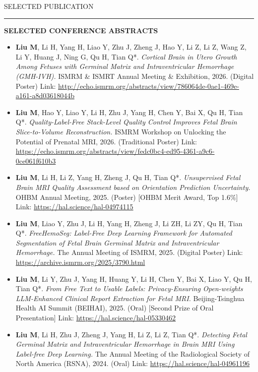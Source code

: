 \documentclass{resume} %
\renewenvironment{rSection}[1]{
\sectionskip
\textcolor{TsinghuaPurple}{\MakeUppercase{#1}}
\sectionlineskip
\hrule
\begin{list}{}{
\setlength{\leftmargin}{0em}
}
\item[]
}{
\end{list}
}
\begin{document}
\begin{rSection}{Selected Publication}
\textbf{SELECTED CONFERENCE ABSTRACTS}

\begin{itemize}
\item \textbf{Liu M}, Li H, Yang H, Liao Y, Zhu J, Zheng J, Hao Y, Li Z, Li Z, Wang Z, Li Y, Huang J, Ning G, Qu H, Tian Q*. \textit{Cortical Brain in Utero Growth Among Fetuses with Germinal Matrix and Intraventricular Hemorrhage (GMH-IVH).} ISMRM \& ISMRT Annual Meeting \& Exhibition, 2026. (Digital Poster) Link: \url{http://echo.ismrm.org/abstracts/view/786064de-0ae1-469e-a161-a8d03618044b}

\item \textbf{Liu M}, Hao Y, Liao Y, Li H, Zhu J, Yang H, Chen Y, Bai X, Qu H, Tian Q*. \textit{Quality-Label-Free Stack-Level Quality Control Improves Fetal Brain Slice-to-Volume Reconstruction.} ISMRM Workshop on Unlocking the Potential of Prenatal MRI, 2026. (Traditional Poster) Link: \url{https://echo.ismrm.org/abstracts/view/fedc0bc4-ed95-4361-a9c6-0ce061f610b3}

\item \textbf{Liu M}, Li H, Li Z, Yang H, Zheng J, Qu H, Tian Q*. \textit{Unsupervised Fetal Brain MRI Quality Assessment based on Orientation Prediction Uncertainty.} OHBM Annual Meeting, 2025. (Poster) [OHBM Merit Award, Top 1.6\%] Link: \url{https://hal.science/hal-04974115}

\item \textbf{Liu M}, Liao Y, Zhu J, Li H, Yang H, Zheng J, Li ZH, Li ZY, Qu H, Tian Q*. \textit{FreeHemoSeg: Label-Free Deep Learning Framework for Automated Segmentation of Fetal Brain Germinal Matrix and Intraventricular Hemorrhage.} The Annual Meeting of ISMRM, 2025. (Digital Poster) Link: \url{https://archive.ismrm.org/2025/3790.html}

\item \textbf{Liu M}, Li Y, Zhu J, Yang H, Huang Y, Li H, Chen Y, Bai X, Liao Y, Qu H, Tian Q*. \textit{From Free Text to Usable Labels: Privacy-Ensuring Open-weights LLM-Enhanced Clinical Report Extraction for Fetal MRI.} Beijing-Tsinghua Health AI Summit (BEIHAI), 2025. (Oral) [Second Prize of Oral Presentation] Link: \url{https://hal.science/hal-05330462}

\item \textbf{Liu M}, Li H, Zhu J, Zheng J, Yang H, Li Z, Li Z, Tian Q*. \textit{Detecting Fetal Germinal Matrix and Intraventricular Hemorrhage in Brain MRI Using Label-free Deep Learning.} The Annual Meeting of the Radiological Society of North America (RSNA), 2024. (Oral) Link: \url{https://hal.science/hal-04961196}


\end{itemize}
\end{rSection}
\end{document}
